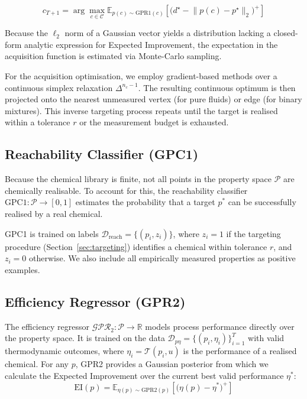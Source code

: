 \documentclass[preprint,12pt]{elsarticle}
\begin{document}
$$c_{T+1} = \arg\max_{c \in \mathcal{C}} \mathbb{E}_{p(c) \sim \mathrm{GPR1}(c)}\!\left[\big(d^\star - \lVert p(c) - p^\star \rVert_2 \big)^+\right]$$

Because the $\ell_2$ norm of a Gaussian vector yields a distribution lacking a closed-form analytic expression for Expected Improvement, the expectation in the acquisition function is estimated via Monte-Carlo sampling.

For the acquisition optimisation, we employ gradient-based methods over a continuous simplex relaxation $\Delta^{n_c-1}$. The resulting continuous optimum is then projected onto the nearest unmeasured vertex (for pure fluids) or edge (for binary mixtures). This inverse targeting process repeats until the target is realised within a tolerance $r$ or the measurement budget is exhausted.

\subsection{Reachability Classifier (GPC1)}
\label{sec:reachability}

Because the chemical library is finite, not all points in the property space $\mathcal{P}$ are chemically realisable. To account for this, the reachability classifier $\mathrm{GPC1}: \mathcal{P} \rightarrow [0, 1]$ estimates the probability that a target $p^*$ can be successfully realised by a real chemical. 

GPC1 is trained on labels $\mathcal{D}_{\text{reach}} = \{ (p_i, z_i) \}$, where $z_i = 1$ if the targeting procedure (Section~\ref{sec:targeting}) identifies a chemical within tolerance $r$, and $z_i = 0$ otherwise. We also include all empirically measured properties as positive examples.

\subsection{Efficiency Regressor (GPR2)}
\label{sec:efficiency}

The efficiency regressor $\mathcal{GPR}_2: \mathcal{P} \rightarrow \mathbb{R}$ models process performance directly over the property space. It is trained on the data $\mathcal{D}_{p\eta} = \{ (p_i, \eta_i) \}_{i=1}^T$ with valid thermodynamic outcomes, where $\eta_i = \mathcal{T}(p_i, u)$ is the performance of a realised chemical. For any $p$, GPR2 provides a Gaussian posterior from which we calculate the Expected Improvement over the current best valid performance $\eta^*$:
\begin{equation}
\mathrm{EI}(p) = \mathbb{E}_{\eta(p) \sim \mathrm{GPR2}(p)}\!\left[\big(\eta(p) - \eta^* \big)^+\right]
\end{equation}
\end{document}
